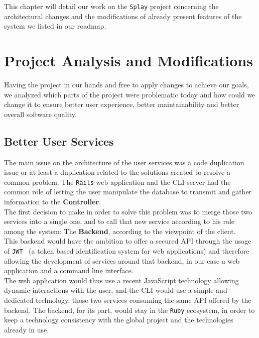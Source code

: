 \documentclass{eplmastersthesis}
\begin{document}
    This chapter will detail our work on the \texttt{Splay} project concerning the
    architectural changes and the modifications of already present features
    of the system we listed in our roadmap.

    \section{Project Analysis and Modifications}

      Having the project in our hands and free to apply changes to achieve our
      goals, we analyzed which parts of the project were problematic today and
      how could we change it to ensure better user experience, better
      maintainability and better overall software quality.

      \subsection{Better User Services}

        The main issue on the architecture of the user services was a code
        duplication issue or at least a duplication related to the solutions
        created to resolve a common problem. The \texttt{Rails} web application and the
        CLI server had the common role of letting the user manipulate the
        database to transmit and gather information to the \textbf{Controller}.\\

        The first decision to make in order to solve this problem was to
        merge those two services into a single one, and to call that new
        service according to his role among the system: The \textbf{Backend},
        according to the viewpoint of the client.\\
        This backend would have the ambition to offer a secured API through
        the usage of \texttt{JWT}~\cite{JWT} (a token based identification system
        for web applications) and therefore allowing the development
        of services around that backend, in our case a web application and
        a command line interface.\\

        The web application would thus use a recent JavaScript technology
        allowing dynamic interactions with the user, and the CLI would use
        a simple and dedicated technology, those two services consuming the
        same API offered by the backend. The backend, for its part, would
        stay in the \texttt{Ruby} ecosystem, in order to keep a technology consistency
        with the global project and the technologies already in use.
\end{document}

